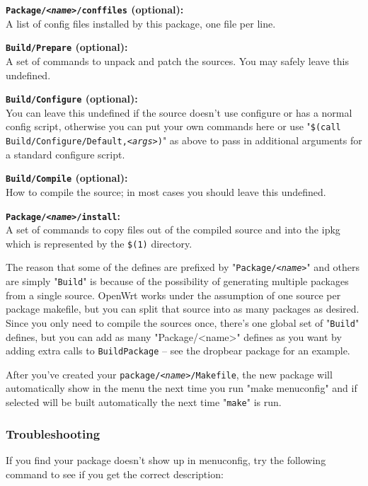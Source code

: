 \textbf{\texttt{Package/\textit{<name>}/conffiles} (optional):} \\
   A list of config files installed by this package, one file per line.

\textbf{\texttt{Build/Prepare} (optional):} \\
   A set of commands to unpack and patch the sources. You may safely leave this
   undefined.

\textbf{\texttt{Build/Configure} (optional):} \\
   You can leave this undefined if the source doesn't use configure or has a
   normal config script, otherwise you can put your own commands here or use
   "\texttt{\$(call Build/Configure/Default,\textit{<args>})}" as above to
   pass in additional arguments for a standard configure script.

\textbf{\texttt{Build/Compile} (optional):} \\
   How to compile the source; in most cases you should leave this undefined.

\textbf{\texttt{Package/\textit{<name>}/install}:} \\
   A set of commands to copy files out of the compiled source and into the ipkg
   which is represented by the \texttt{\$(1)} directory.

The reason that some of the defines are prefixed by "\texttt{Package/\textit{<name>}}"
and others are simply "\texttt{Build}" is because of the possibility of generating
multiple packages from a single source. OpenWrt works under the assumption of one
source per package makefile, but you can split that source into as many packages as
desired. Since you only need to compile the sources once, there's one global set of
"\texttt{Build}" defines, but you can add as many "Package/<name>" defines as you want
by adding extra calls to \texttt{BuildPackage} -- see the dropbear package for an example.

After you've created your \texttt{package/\textit{<name>}/Makefile}, the new package
will automatically show in the menu the next time you run "make menuconfig" and if selected
will be built automatically the next time "\texttt{make}" is run.

\subsubsection{Troubleshooting}

If you find your package doesn't show up in menuconfig, try the following command to
see if you get the correct description:

